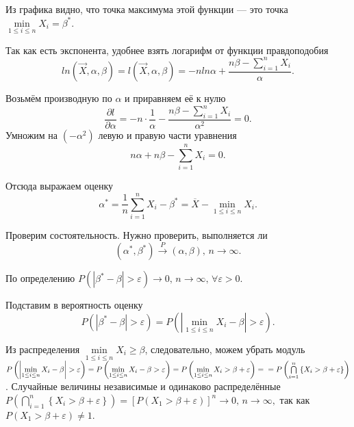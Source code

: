 Из графика видно, что точка максимума этой функции ---
это точка $ \min \limits_{1 \leq i \leq n} X_i = \beta^*$.

Так как есть экспонента, удобнее взять логарифм от функции правдоподобия
$$ln \left( \vec{X}, \alpha, \beta \right) =
  l \left( \vec{X}, \alpha, \beta \right) =
  -n ln \alpha + \frac{n \beta - \sum \limits_{i = 1}^n X_i}{ \alpha }.$$

Возьмём производную по $ \alpha $ и приравняем её к нулю
$$ \frac{ \partial l}{ \partial \alpha } =
  -n \cdot \frac{1}{ \alpha } - \frac{n \beta - \sum \limits_{i = 1}^n X_i}{ \alpha^2} =
  0.$$
Умножим на $ \left( - \alpha^2 \right) $ левую и правую части уравнения
$$n \alpha + n \beta - \sum \limits_{i = 1}^n X_i =
  0.$$

Отсюда выражаем оценку
$$ \alpha^* =
  \frac{1}{n} \sum \limits_{i = 1}^n X_i - \beta^* =
  \overline{X} - \min \limits_{1 \leq i \leq n} X_i.$$

Проверим состоятельность.
Нужно проверить,
выполняется ли
$$ \left( \alpha^*, \beta^* \right) \overset{P}{ \to } \left( \alpha , \beta \right), \,
  n \to \infty.$$

По определению
$P \left( \left| \beta^* - \beta \right| > \varepsilon \right) \to 0, \,
  n \to \infty, \,
  \forall \varepsilon > 0$.

Подставим в вероятность оценку
$$P \left( \left| \beta^* - \beta \right| > \varepsilon \right) =
  P \left( \left| \min \limits_{1 \leq i \leq n} X_i - \beta \right| > \varepsilon \right).$$

Из распределения $ \min \limits_{1 \leq i \leq n} X_i \geq \beta $, следовательно,
можем убрать модуль
$P \left( \left| \min \limits_{1 \leq i \leq n} X_i - \beta \right| > \varepsilon \right) =
  P \left( \min \limits_{1 \leq i \leq n} X_i - \beta > \varepsilon \right) =
  P \left( \min \limits_{1 \leq i \leq n} X_i > \beta + \varepsilon \right) = \\
  = P \left( \bigcap \limits_{i = 1}^n \left\{ X_i > \beta + \varepsilon \right\} \right) $.
Случайные величины независимые и одинаково распределённые
$P \left( \bigcap \limits_{i = 1}^n \left\{ X_i > \beta + \varepsilon \right\} \right) =
  \left[ P \left( X_1 > \beta + \varepsilon \right) \right]^n \to 0, \,
  n \to \infty,$
так как $P \left( X_1 > \beta + \varepsilon \right) \neq 1$.


